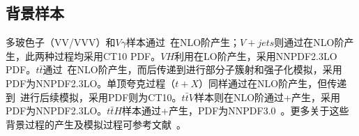 \subsection{背景样本}
多玻色子（VV/VVV）和$V\gamma$样本通过~\cite{sherpa}在NLO阶产生；$V+jets$则通过在NLO阶产生，此两种过程均采用CT10 PDF。$VH$利用在LO阶产生，采用NNPDF2.3LO PDF。$t\bar{t}$通过~\cite{powhegbox}在NLO阶产生，而后传递到进行部分子簇射和强子化模拟，采用PDF为NNPDF2.3LO。单顶夸克过程（$t+X$）同样通过在NLO阶产生，但传递到~\cite{pythia6}进行后续模拟，采用PDF则为CT10。$t\bar{t}V$样本则在NLO阶通过\MGMCatNLO+产生，采用PDF为NNPDF2.3LO。$t\bar{t}H$样本通过\MGMCatNLO+\Herwigpp 产生，PDF为NNPDF3.0~\cite{PDF:NNPDF30}。更多关于这些背景过程的产生及模拟过程可参考文献~\cite{ATL-PHYS-PUB-2016-004,ATL-PHYS-PUB-2016-005,ATL-PHYS-PUB-2016-002}。

